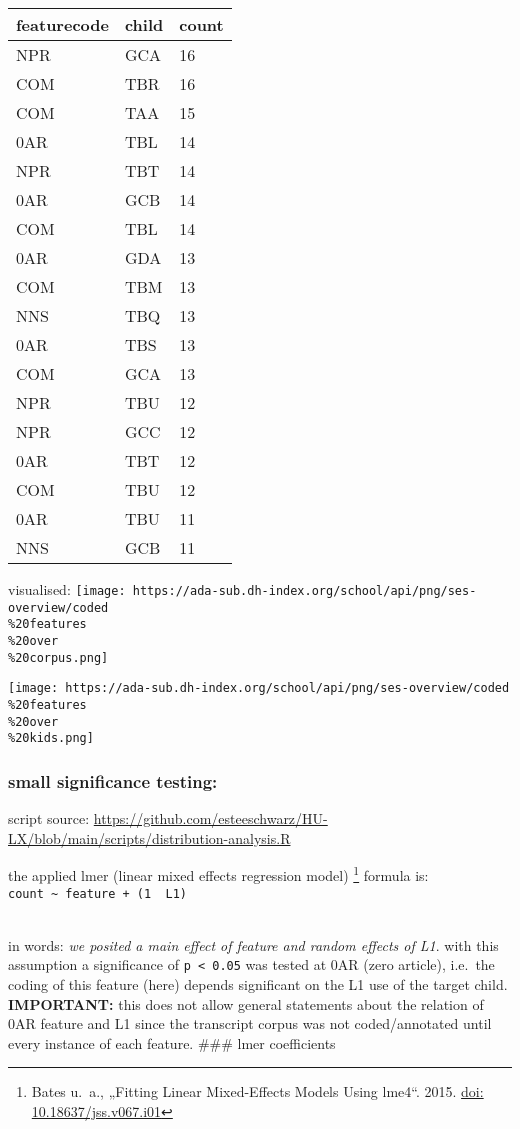 \documentclass[
  12pt,
]{article}
\begin{document}
\begin{longtable}[]{@{}lll@{}}
\toprule\noalign{}
featurecode & child & count \\
\midrule\noalign{}
\endhead
\bottomrule\noalign{}
\endlastfoot
NPR & GCA & 16 \\
COM & TBR & 16 \\
COM & TAA & 15 \\
0AR & TBL & 14 \\
NPR & TBT & 14 \\
0AR & GCB & 14 \\
COM & TBL & 14 \\
0AR & GDA & 13 \\
COM & TBM & 13 \\
NNS & TBQ & 13 \\
0AR & TBS & 13 \\
COM & GCA & 13 \\
NPR & TBU & 12 \\
NPR & GCC & 12 \\
0AR & TBT & 12 \\
COM & TBU & 12 \\
0AR & TBU & 11 \\
NNS & GCB & 11 \\
\end{longtable}

visualised:
\texttt{[image: https://ada-sub.dh-index.org/school/api/png/ses-overview/coded\\\%20features\\\%20over\\\%20corpus.png]}

\texttt{[image: https://ada-sub.dh-index.org/school/api/png/ses-overview/coded\\\%20features\\\%20over\\\%20kids.png]}

\hypertarget{small-significance-testing}{%
\subsubsection{small significance
testing:}\label{small-significance-testing}}

script source:
\url{https://github.com/esteeschwarz/HU-LX/blob/main/scripts/distribution-analysis.R}

the applied lmer (linear mixed effects regression model) \footnote{Bates
  u.~a., „Fitting Linear Mixed-Effects Models Using lme4``. 2015.
  \href{10.18637/jss.v067.i01}{doi: 10.18637/jss.v067.i01}} formula
is:\\
\texttt{count\ \textasciitilde{}\ feature\ +\ (1\ \textbar{}\ L1)}\strut \\
in words: \emph{we posited a main effect of feature and random effects
of L1}. with this assumption a significance of
\texttt{p\ \textless{}\ 0.05} was tested at 0AR (zero article), i.e.~the
coding of this feature (here) depends significant on the L1 use of the
target child. \textbf{IMPORTANT:} this does not allow general statements
about the relation of 0AR feature and L1 since the transcript corpus was
not coded/annotated until every instance of each feature. \#\#\# lmer
coefficients
\end{document}
